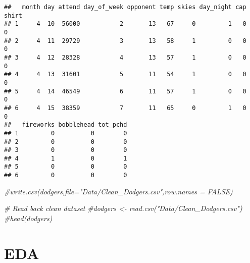 \documentclass[
]{article}
\newenvironment{Shaded}{\begin{snugshade}}{\end{snugshade}}
\newcommand{\CommentTok}[1]{\textcolor[rgb]{0.56,0.35,0.01}{\textit{#1}}}
\newcommand{\KeywordTok}[1]{\textcolor[rgb]{0.13,0.29,0.53}{\textbf{#1}}}
\newcommand{\NormalTok}[1]{#1}
\newcommand{\OperatorTok}[1]{\textcolor[rgb]{0.81,0.36,0.00}{\textbf{#1}}}
\newcommand{\StringTok}[1]{\textcolor[rgb]{0.31,0.60,0.02}{#1}}
\begin{document}
\begin{Shaded}
\end{Shaded}

\begin{verbatim}
##   month day attend day_of_week opponent temp skies day_night cap shirt
## 1     4  10  56000           2       13   67     0         1   0     0
## 2     4  11  29729           3       13   58     1         0   0     0
## 3     4  12  28328           4       13   57     1         0   0     0
## 4     4  13  31601           5       11   54     1         0   0     0
## 5     4  14  46549           6       11   57     1         0   0     0
## 6     4  15  38359           7       11   65     0         1   0     0
##   fireworks bobblehead tot_pchd
## 1         0          0        0
## 2         0          0        0
## 3         0          0        0
## 4         1          0        1
## 5         0          0        0
## 6         0          0        0
\end{verbatim}

\begin{Shaded}
\begin{Highlighting}[]
\CommentTok{#write.csv(dodgers,file="Data/Clean_Dodgers.csv",row.names = FALSE)}
\end{Highlighting}
\end{Shaded}

\begin{Shaded}
\begin{Highlighting}[]
\CommentTok{# Read back clean dataset}
\CommentTok{#dodgers <- read.csv("Data/Clean_Dodgers.csv")}
\CommentTok{#head(dodgers)}
\end{Highlighting}
\end{Shaded}

\hypertarget{eda}{%
\section{EDA}\label{eda}}
\end{document}
